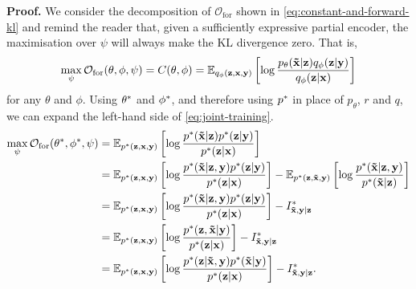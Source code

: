 \textbf{Proof.} 
We consider the decomposition of $\mathcal{O}_\mathrm{for}$ shown in
\cref{eq:constant-and-forward-kl} and remind the reader that, given a
sufficiently expressive partial encoder, the maximisation over $\psi$ will
always make the KL divergence zero. That is,
\begin{equation}
  \max_{\psi } \mathcal{O}_\mathrm{for}(\theta, \phi, \psi ) = C(\theta, \phi) = \mathbb{E}_{q_\phi({\mathbf{z}},{\mathbf{x}},{\mathbf{y}})} \left[ \log \frac{p_\theta(\mathbf{\tilde{x}}{}|{\mathbf{z}})q_\phi({\mathbf{z}}|{\mathbf{y}})}{q_\phi({\mathbf{z}}|{\mathbf{x}})} \right] \label{eq:forward-max-phi}
\end{equation}
for any $\theta$ and $\phi$. Using ${\theta}^*$ and ${\phi}^*$, and
therefore using ${p}^*{}$ in place of $p_\theta$, $r$ and $q$, we can expand the
left-hand side of \cref{eq:joint-training}.
\begin{align}
  \max_{\psi } \mathcal{O}_\mathrm{for}({\theta}^*, {\phi}^*, \psi ) &= \mathbb{E}_{{p}^*{}({\mathbf{z}},{\mathbf{x}},{\mathbf{y}})} \left[ \log \frac{{p}^*{}(\mathbf{\tilde{x}}{}|{\mathbf{z}}){p}^*{}({\mathbf{z}}|{\mathbf{y}})}{{p}^*({\mathbf{z}}|{\mathbf{x}})} \right] \\
                                                                                           &= \mathbb{E}_{{p}^*{}({\mathbf{z}},{\mathbf{x}},{\mathbf{y}})} \left[ \log \frac{{p}^*{}(\mathbf{\tilde{x}}{}|{\mathbf{z}},{\mathbf{y}}){p}^*{}({\mathbf{z}}|{\mathbf{y}})}{{p}^*({\mathbf{z}}|{\mathbf{x}})} \right] - \mathbb{E}_{{p}^*{}({\mathbf{z}},\mathbf{\tilde{x}}{},{\mathbf{y}})} \left[ \log\frac{{p}^*{}(\mathbf{\tilde{x}}{}|{\mathbf{z}},{\mathbf{y}})}{{p}^*{}(\mathbf{\tilde{x}}{}|{\mathbf{z}})} \right] \\
                                                                                           &= \mathbb{E}_{{p}^*{}({\mathbf{z}},{\mathbf{x}},{\mathbf{y}})} \left[ \log \frac{{p}^*{}(\mathbf{\tilde{x}}{}|{\mathbf{z}},{\mathbf{y}}){p}^*{}({\mathbf{z}}|{\mathbf{y}})}{{p}^*({\mathbf{z}}|{\mathbf{x}})} \right] - I^*_{\mathbf{\tilde{x}}{},\mathbf{y}{}|\mathbf{z}{}}{}\\
                                                                                           &= \mathbb{E}_{{p}^*{}({\mathbf{z}},{\mathbf{x}},{\mathbf{y}})} \left[ \log \frac{{p}^*{}({\mathbf{z}},\mathbf{\tilde{x}}{}|{\mathbf{y}})}{{p}^*({\mathbf{z}}|{\mathbf{x}})} \right] - I^*_{\mathbf{\tilde{x}}{},\mathbf{y}{}|\mathbf{z}{}}{}\\
                                                                                           &= \mathbb{E}_{{p}^*{}({\mathbf{z}},{\mathbf{x}},{\mathbf{y}})} \left[ \log \frac{{p}^*{}({\mathbf{z}}|\mathbf{\tilde{x}}{},{\mathbf{y}}){p}^*{}(\mathbf{\tilde{x}}{}|{\mathbf{y}})}{{p}^*({\mathbf{z}}|{\mathbf{x}})} \right] - I^*_{\mathbf{\tilde{x}}{},\mathbf{y}{}|\mathbf{z}{}}{}. \label{eq:pre-mapping}
\end{align}
